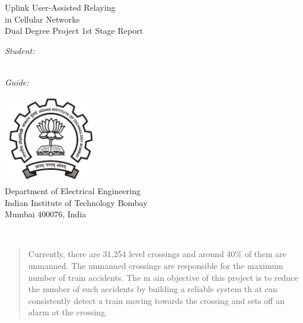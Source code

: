 \documentclass[aps,letterpaper,11pt]{article}
\begin{document}
\begin{titlepage}
\begin{center}

{\Huge 
Uplink User-Assisted Relaying \\ in Cellular Networks 
}~\\[4cm]


{\large 
Dual Degree Project 1st Stage Report
}~\\[2cm]

\end{center}

\begin{multicols}{2}
\begin{flushleft}
{\large
\textit{Student:} \\
 \\
}
\end{flushleft}
\columnbreak
\begin{flushright}
{\large
\textit{Guide:} \\
}
\end{flushright}
\end{multicols}

\vfill

\begin{center}
\includegraphics[width=4cm]{figures/iitbblack.jpg}~\\[1cm]

{\large
Department of Electrical Engineering\\
Indian Institute of Technology Bombay\\
Mumbai 400076, India\\
}

\end{center}
\end{titlepage}

\mbox{}
\newpage

\tableofcontents
\newpage
\mbox{}
\newpage
~\\[6cm]
\begin{abstract}
Currently, there are 31,254 level crossings and around 40\% of them are unmanned. The unmanned
crossings are responsible for the maximum number of train accidents. The m
ain objective of this project
is to reduce the number of such accidents by building a reliable system th
at can consistently detect a train
moving towards the crossing and sets off an alarm at the crossing.
\end{abstract}
\newpage
\mbox{}
\newpage
\end{document}
